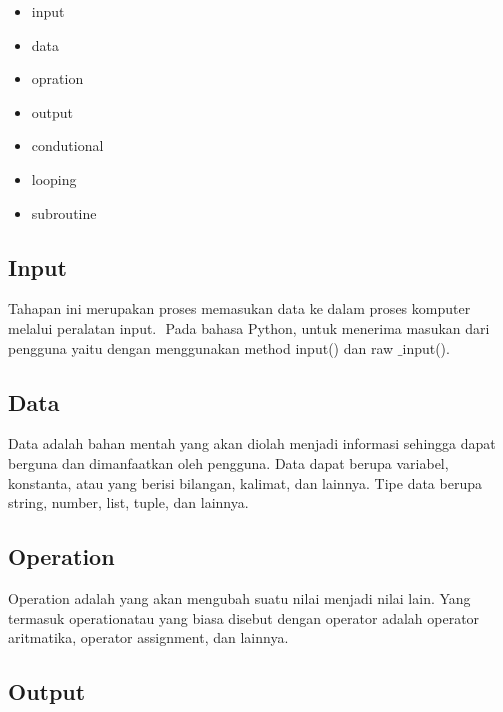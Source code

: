 {\begin{itemize}
	\item input 
	\item data
	\item opration
	\item output
	\item condutional
	\item looping
	\item subroutine
\end{itemize}
\vspace{14pt}
\noindent 
{\fontsize{14pt}{14pt}\subsection {Input}
\noindent 
{\fontsize{14pt}{14pt}\selectfont Tahapan ini merupakan proses memasukan data ke dalam proses komputer melalui peralatan $  $input. $  $ Pada bahasa Python, untuk menerima masukan dari pengguna yaitu dengan menggunakan $  $method input() $  $dan $  $raw $  \_  $input(). \\} \par
\noindent 
{\fontsize{14pt}{14pt}\subsection {Data}
\noindent 
{\fontsize{14pt}{14pt}\selectfont Data adalah bahan mentah yang akan diolah menjadi informasi sehingga dapat berguna dan dimanfaatkan oleh pengguna. Data dapat berupa variabel, konstanta, atau yang berisi bilangan, kalimat, dan lainnya. Tipe data berupa string, number, list, tuple, dan lainnya. \\} \par
\vspace{14pt}
\noindent 
{\fontsize{14pt}{14pt}\subsection {Operation}
\noindent 
{\fontsize{14pt}{14pt}\selectfont Operation $  $adalah yang akan mengubah suatu nilai menjadi nilai lain. Yang termasuk $  $operationatau yang biasa disebut dengan operator adalah operator aritmatika, operator assignment, dan lainnya. \\} \par
\vspace{14pt}
\noindent 
{\fontsize{14pt}{14pt}\subsection {Output}
}}}}}
